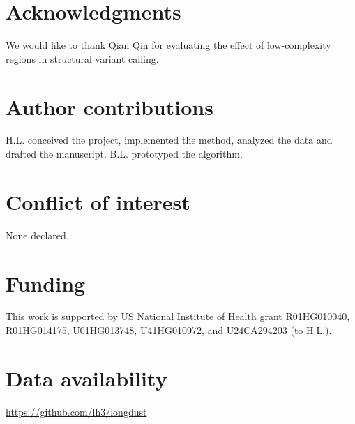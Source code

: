 \documentclass[webpdf,contemporary,large,namedate]{oup-authoring-template}%
\begin{document}
\section*{Acknowledgments}

We would like to thank Qian Qin for evaluating the effect of low-complexity regions in structural variant calling.

\section*{Author contributions}

H.L. conceived the project, implemented the method, analyzed the data and drafted the manuscript.
B.L. prototyped the algorithm.

\section*{Conflict of interest}

None declared.

\section*{Funding}

This work is supported by US National Institute of Health grant R01HG010040, R01HG014175, U01HG013748, U41HG010972, and U24CA294203 (to H.L.).

\section*{Data availability}

\url{https://github.com/lh3/longdust}


{\sffamily\small
}
\end{document}
